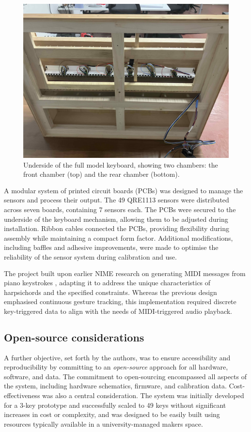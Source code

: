 \begin{figure}  
  \centering
  \includegraphics[width=\linewidth]{src/images/49-key-bottom-sensors-no-keys.jpg} 
  \caption{Underside of the full model keyboard, showing two chambers: the front chamber (top) and the rear chamber (bottom).} 
  \Description{} 
  \label{fig:49-key-bottom}
\end{figure}

A modular system of printed circuit boards (PCBs) was designed to manage the sensors and process their output. The 49 QRE1113 sensors were distributed across seven boards, containing 7 sensors each. The PCBs were secured to the underside of the keyboard mechanism, allowing them to be adjusted during installation. Ribbon cables connected the PCBs, providing flexibility during assembly while maintaining a compact form factor. Additional modifications, including baffles and adhesive improvements, were made to optimise the reliability of the sensor system during calibration and use.


The project built upon earlier NIME research on generating MIDI messages from piano keystrokes \cite{McPherson2013}, adapting it to address the unique characteristics of harpsichords and the specified constraints. Whereas the previous design emphasised continuous gesture tracking, this implementation required discrete key-triggered data to align with the needs of MIDI-triggered audio playback. 

\subsection{Open-source considerations}
A further objective, set forth by the authors, was to ensure accessibility and reproducibility by committing to an \emph{open-source} approach for all hardware, software, and data. The commitment to open-sourcing encompassed all aspects of the system, including hardware schematics, firmware, and calibration data. Cost-effectiveness was also a central consideration. The system was initially developed for a 3-key prototype and successfully scaled to 49 keys without significant increases in cost or complexity, and was designed to be easily built using resources typically available in a university-managed makers space.


